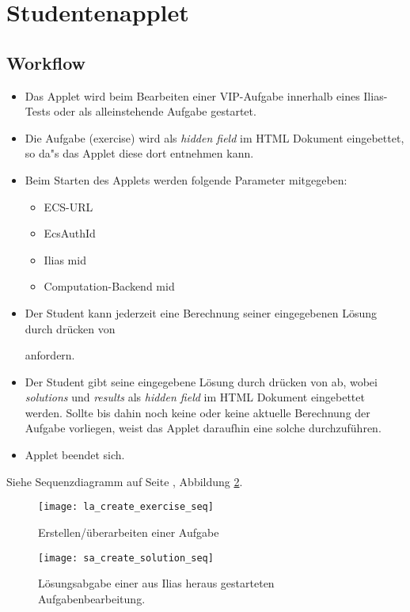 \documentclass[12pt,a4paper]{article}
\newcommand{\button}[1]{\fbox{\texttt{#1}}}
\begin{document}
\section{Studentenapplet}
\subsection{Workflow}
\begin{itemize}
  \item Das Applet wird beim Bearbeiten einer VIP-Aufgabe innerhalb eines Ilias-Tests
    oder als alleinstehende Aufgabe gestartet.
  \item Die Aufgabe (exercise) wird als \textit{hidden field} im HTML
    Dokument eingebettet, so da"s das Applet diese dort entnehmen kann.
  \item Beim Starten des Applets werden folgende Parameter mitgegeben:
    \begin{itemize}
      \item ECS-URL
      \item EcsAuthId
      \item Ilias mid
      \item Computation-Backend mid
    \end{itemize}
  \item Der Student kann jederzeit eine Berechnung seiner eingegebenen Lösung
    durch drücken von\addtocounter{footnote}{-2}
    \button{berechnen}\footnotemark anfordern.
  \item Der Student gibt seine eingegebene Lösung durch drücken von
    \button{weiter}\footnotemark ab, wobei \textit{solutions} und
    \textit{results} als \textit{hidden field} im HTML Dokument eingebettet
    werden. Sollte bis dahin noch keine oder keine aktuelle Berechnung der
    Aufgabe vorliegen, weist das Applet daraufhin eine solche durchzuführen.
  \item Applet beendet sich.
\end{itemize}
Siehe Sequenzdiagramm auf Seite \pageref{seq:sa_create_solution_seq}, Abbildung \ref{seq:sa_create_solution_seq}.

\begin{figure}[p]
  \texttt{[image: la\_create\_exercise\_seq]}
  \caption{\label{seq:la_create_exercise}Erstellen/überarbeiten einer Aufgabe}
\end{figure}

\begin{figure}[p]
  \texttt{[image: sa\_create\_solution\_seq]}
  \caption{\label{seq:sa_create_solution_seq}Lösungsabgabe einer aus Ilias
  heraus gestarteten Aufgabenbearbeitung.}
\end{figure}
\end{document}
